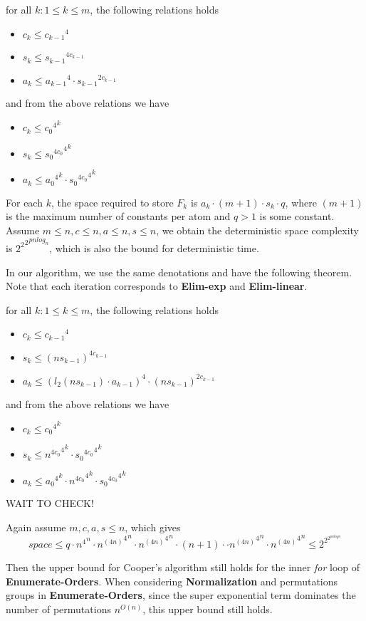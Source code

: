 {\begin{theorem}
for all $k: 1\le k\le m$, the following relations holds
\begin{itemize}
    \item $c_k \le {c_{k-1}}^4$
    \item $s_k \le {s_{k-1}}^{4c_{k-1}}$
    \item $a_k \le {a_{k-1}}^4 \cdot {s_{k-1}}^{2c_{k-1}}$
\end{itemize}
and from the above relations we have 
\begin{itemize}
    \item $c_k \le {{c_0}^4}^k$
    \item $s_k \le {{{s_0}^{4c_0}}^4}^k$
    \item $a_k \le {{a_0}^4}^k \cdot {{{s_0}^{4c_0}}^4}^k$
\end{itemize}
\end{theorem}

For each $k$,
the space required to store $F_k$ 
is $a_k \cdot (m+1) \cdot s_k \cdot q$,
where $(m+1)$ is the maximum number of constants per atom and $q>1$ is some constant. Assume $m\le n, c\le n, a\le n, s\le n$, we obtain the deterministic space complexity is ${{2^2}^2}^{p n log_n}$, which is also the bound for deterministic time.

In our algorithm,
we use the same denotations and have the following theorem. 
Note that each iteration corresponds to \textbf{Elim-exp} and \textbf{Elim-linear}.
\begin{theorem}
for all $k: 1\le k\le m$, the following relations holds
\begin{itemize}
    \item $c_k \le {c_{k-1}}^4$
    \item $s_k \le {(n s_{k-1})}^{4c_{k-1}}$
    \item $a_k \le {{(l_2(ns_{k-1})\cdot a_{k-1})}}^4 \cdot {(n s_{k-1})}^{2c_{k-1}}$
\end{itemize}
and from the above relations we have 
\begin{itemize}
    \item $c_k \le {{c_0}^4}^k$
    \item $s_k \le {{{n}^{4c_0}}^4}^k \cdot {{{s_0}^{4c_0}}^4}^k$
    \item $a_k \le {{a_0}^4}^k \cdot 
     {{{n}^{4c_0}}^4}^k
     \cdot {{{s_0}^{4c_0}}^4}^k$
\end{itemize}
\end{theorem}

WAIT TO CHECK!

Again assume $m,c,a,s\le n$, which gives 
$$
\textit{space}\le q \cdot {n^4}^n \cdot {{n^{(4n)}}^4}^n \cdot
{{n^{(4n)}}^4}^n \cdot (n+1) \cdot 
\cdot {{n^{(4n)}}^4}^n \cdot {{n^{(4n)}}^4}^n
\le 2^{2^{2^{p n \textit{log}n}}}
$$

Then the upper bound for Cooper's algorithm still holds for the inner \textit{for} loop of \textbf{Enumerate-Orders}.
When considering \textbf{Normalization} and permutations groups in \textbf{Enumerate-Orders},
since the super exponential term dominates the number of permutations $n^{O(n)}$,
this upper bound still holds.


}
